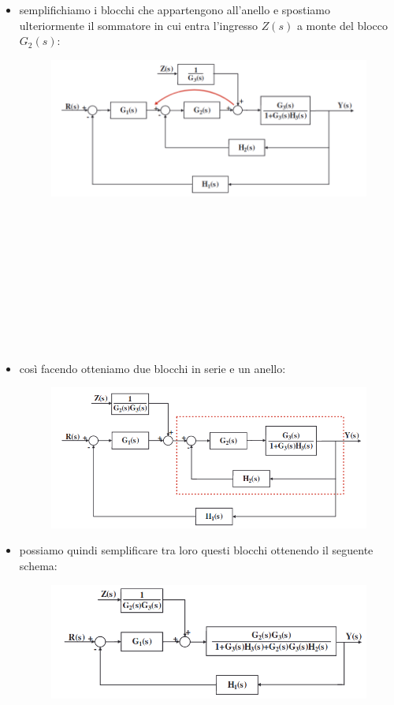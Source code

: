\documentclass[12pt,a4paper]{article}
\begin{document}
\begin{itemize}
\begin{figure}[h!]
		\end{figure}
		\item semplifichiamo i blocchi che appartengono all'anello e spostiamo ulteriormente il sommatore in cui entra l'ingresso $Z(s)$ a monte del blocco $G_2(s)$:
		\begin{figure}[h!]
			\centering
			\includegraphics[scale=0.4]{./images/schema26_5.png}
		\end{figure}
		\\ \\ \\ \\ \\ \\ \\ \\ \\
		\item cos\`i facendo otteniamo due blocchi in serie e un anello:
		\begin{figure}[h!]
			\centering
			\includegraphics[scale=0.4]{./images/schema26_6.png}
		\end{figure}
		\item possiamo quindi semplificare tra loro questi blocchi ottenendo il seguente schema:
		\begin{figure}[h!]
			\centering
			\includegraphics[scale=0.4]{./images/schema26_7.png}

\end{figure}
\end{itemize}
\end{document}
